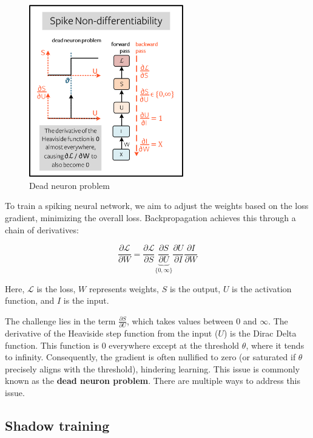 \documentclass[11pt]{article}
\begin{document}
\begin{figure}
  \centering
  \includegraphics[width=0.6\textwidth]{./image/non-differentiability.png}
  \caption{Dead neuron problem\cite{eshraghian2021training}}
\end{figure}

To train a spiking neural network, we aim to adjust the weights based on the loss gradient, minimizing the overall loss. Backpropagation achieves this through a chain of derivatives:

$$
  \frac{\partial \mathcal{L}}{\partial W} =
  \frac{\partial \mathcal{L}}{\partial S}
  \underbrace{\frac{\partial S}{\partial U}}_{\{0, \infty\}}
  \frac{\partial U}{\partial I}
  \frac{\partial I}{\partial W}
$$

Here, $\mathcal{L}$ is the loss, $W$ represents weights, $S$ is the output, $U$ is the activation function, and $I$ is the input.

The challenge lies in the term $\frac{\partial S}{\partial U}$, which takes values between $0$ and $\infty$. The derivative of the Heaviside step function from the input ($U$) is the Dirac Delta function. This function is $0$ everywhere except at the threshold $\theta$, where it tends to infinity. Consequently, the gradient is often nullified to zero (or saturated if $\theta$ precisely aligns with the threshold), hindering learning. This issue is commonly known as the \textbf{dead neuron problem}. There are multiple ways to address this issue.

\subsection{Shadow training}
\end{document}
